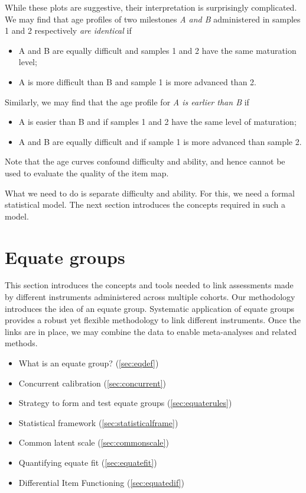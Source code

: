 \documentclass[
]{book}
\providecommand{\tightlist}{%
  \setlength{\itemsep}{0pt}\setlength{\parskip}{0pt}}
\begin{document}
While these plots are suggestive, their interpretation is surprisingly complicated. We may find that age profiles of two milestones \emph{A and B} administered in samples 1 and 2 respectively \emph{are identical} if

\begin{itemize}
\tightlist
\item
  A and B are equally difficult and samples 1 and 2 have the same maturation level;
\item
  A is more difficult than B and sample 1 is more advanced than 2.
\end{itemize}

Similarly, we may find that the age profile for \emph{A is earlier than B} if

\begin{itemize}
\tightlist
\item
  A is easier than B and if samples 1 and 2 have the same level of maturation;
\item
  A and B are equally difficult and if sample 1 is more advanced than sample 2.
\end{itemize}

Note that the age curves confound difficulty and ability, and hence cannot be used to evaluate the quality of the item map.

What we need to do is separate difficulty and ability. For this, we need a formal statistical model. The next section introduces the concepts required in such a model.

\newpage

\hypertarget{ch:equategroups}{%
\chapter{Equate groups}\label{ch:equategroups}}

This section introduces the concepts and tools needed to link assessments made by different instruments administered across multiple cohorts. Our methodology introduces the idea of an equate group. Systematic application of equate groups provides a robust yet flexible methodology to link different instruments. Once the links are in place, we may combine the data to enable meta-analyses and related methods.

\begin{itemize}
\tightlist
\item
  What is an equate group? (\ref{sec:eqdef})
\item
  Concurrent calibration (\ref{sec:concurrent})
\item
  Strategy to form and test equate groups (\ref{sec:equaterules})
\item
  Statistical framework (\ref{sec:statisticalframe})
\item
  Common latent scale (\ref{sec:commonscale})
\item
  Quantifying equate fit (\ref{sec:equatefit})
\item
  Differential Item Functioning (\ref{sec:equatedif})
\end{itemize}
\end{document}
